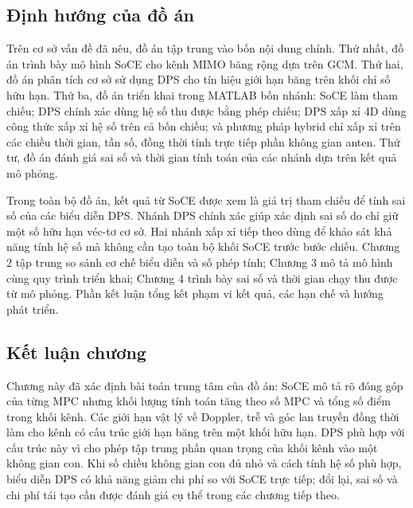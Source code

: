 \subsection{Định hướng của đồ án}
\label{subsec:ch1_thesis_direction}

Trên cơ sở vấn đề đã nêu, đồ án tập trung vào bốn nội dung chính. Thứ nhất, đồ án trình bày mô hình SoCE cho kênh MIMO băng rộng dựa trên GCM. Thứ hai, đồ án phân tích cơ sở sử dụng DPS cho tín hiệu giới hạn băng trên khối chỉ số hữu hạn. Thứ ba, đồ án triển khai trong MATLAB bốn nhánh: SoCE làm tham chiếu; DPS chính xác dùng hệ số thu được bằng phép chiếu; DPS xấp xỉ 4D dùng công thức xấp xỉ hệ số trên cả bốn chiều; và phương pháp hybrid chỉ xấp xỉ trên các chiều thời gian, tần số, đồng thời tính trực tiếp phần không gian anten. Thứ tư, đồ án đánh giá sai số và thời gian tính toán của các nhánh dựa trên kết quả mô phỏng.

Trong toàn bộ đồ án, kết quả từ SoCE được xem là giá trị tham chiếu để tính sai số của các biểu diễn DPS. Nhánh DPS chính xác giúp xác định sai số do chỉ giữ một số hữu hạn véc-tơ cơ sở. Hai nhánh xấp xỉ tiếp theo dùng để khảo sát khả năng tính hệ số mà không cần tạo toàn bộ khối SoCE trước bước chiếu. Chương 2 tập trung so sánh cơ chế biểu diễn và số phép tính; Chương 3 mô tả mô hình cùng quy trình triển khai; Chương 4 trình bày sai số và thời gian chạy thu được từ mô phỏng. Phần kết luận tổng kết phạm vi kết quả, các hạn chế và hướng phát triển.

\subsection{Kết luận chương}
\label{subsec:ch1_conclusion}

Chương này đã xác định bài toán trung tâm của đồ án: SoCE mô tả rõ đóng góp của từng MPC nhưng khối lượng tính toán tăng theo số MPC và tổng số điểm trong khối kênh. Các giới hạn vật lý về Doppler, trễ và góc lan truyền đồng thời làm cho kênh có cấu trúc giới hạn băng trên một khối hữu hạn. DPS phù hợp với cấu trúc này vì cho phép tập trung phần quan trọng của khối kênh vào một không gian con. Khi số chiều không gian con đủ nhỏ và cách tính hệ số phù hợp, biểu diễn DPS có khả năng giảm chi phí so với SoCE trực tiếp; đổi lại, sai số và chi phí tái tạo cần được đánh giá cụ thể trong các chương tiếp theo.

\cleardoublepage
